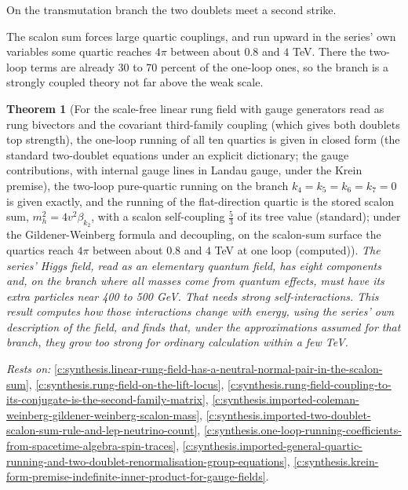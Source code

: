\documentclass[11pt]{article}
\newtheorem{theorem}{Theorem}[section]
\theoremstyle{definition}
\theoremstyle{plain}
\begin{document}
On the transmutation branch the two doublets meet a second strike.

The scalon sum forces large quartic couplings, and run upward in the series' own variables some quartic reaches $4\pi$ between about $0.8$ and $4$ TeV. There the two-loop terms are already 30 to 70 percent of the one-loop ones, so the branch is a strongly coupled theory not far above the weak scale.

\begin{theorem}[For the scale-free linear rung field with gauge generators read as rung bivectors and the covariant third-family coupling (which gives both doublets top strength), the one-loop running of all ten quartics is given in closed form (the standard two-doublet equations under an explicit dictionary; the gauge contributions, with internal gauge lines in Landau gauge, under the Krein premise), the two-loop pure-quartic running on the branch $k_{4} = k_{5} = k_{6} = k_{7} = 0$ is given exactly, and the running of the flat-direction quartic is the stored scalon sum, $m_{h}^{2} = 4v^{2}\beta_{k_{2}}$, with a scalon self-coupling $\tfrac53$ of its tree value (standard); under the Gildener-Weinberg formula and decoupling, on the scalon-sum surface the quartics reach $4\pi$ between about $0.8$ and $4$ TeV at one loop (computed)]\label{c:synthesis.rung-field-quartics-run-to-strong-coupling-within-a-few-tev-on-the-transmutation-branch}
The series' Higgs field, read as an elementary quantum field, has eight components and, on the branch where all masses come from quantum effects, must have its extra particles near 400 to 500 GeV. That needs strong self-interactions. This result computes how those interactions change with energy, using the series' own description of the field, and finds that, under the approximations assumed for that branch, they grow too strong for ordinary calculation within a few TeV.
\end{theorem}
\noindent\emph{Rests on:} \ref{c:synthesis.linear-rung-field-has-a-neutral-normal-pair-in-the-scalon-sum}, \ref{c:synthesis.rung-field-on-the-lift-locus}, \ref{c:synthesis.rung-field-coupling-to-its-conjugate-is-the-second-family-matrix}, \ref{c:synthesis.imported-coleman-weinberg-gildener-weinberg-scalon-mass}, \ref{c:synthesis.imported-two-doublet-scalon-sum-rule-and-lep-neutrino-count}, \ref{c:synthesis.one-loop-running-coefficients-from-spacetime-algebra-spin-traces}, \ref{c:synthesis.imported-general-quartic-running-and-two-doublet-renormalisation-group-equations}, \ref{c:synthesis.krein-form-premise-indefinite-inner-product-for-gauge-fields}.
\end{document}
